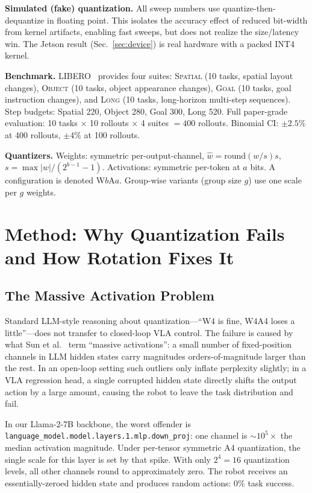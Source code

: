 \documentclass[conference]{IEEEtran}
\begin{document}
\textbf{Simulated (fake) quantization.} All sweep numbers use quantize-then-dequantize in
floating point. This isolates the accuracy effect of reduced bit-width from kernel artifacts,
enabling fast sweeps, but does not realize the size/latency win. The Jetson result
(Sec.~\ref{sec:device}) is real hardware with a packed INT4 kernel.

\textbf{Benchmark.} LIBERO~\cite{libero} provides four suites: \textsc{Spatial} (10 tasks,
spatial layout changes), \textsc{Object} (10 tasks, object appearance changes),
\textsc{Goal} (10 tasks, goal instruction changes), and \textsc{Long} (10 tasks,
long-horizon multi-step sequences). Step budgets: Spatial 220, Object 280, Goal 300, Long 520.
Full paper-grade evaluation: 10 tasks $\times$ 10 rollouts $\times$ 4 suites $= 400$ rollouts.
Binomial CI: $\pm 2.5\%$ at 400 rollouts, $\pm 4\%$ at 100 rollouts.

\textbf{Quantizers.}
Weights: symmetric per-output-channel, $\hat{w}=\mathrm{round}(w/s)s$,
$s=\max|w|/(2^{b-1}-1)$. Activations: symmetric per-token at $a$ bits. A configuration is
denoted W$b$A$a$. Group-wise variants (group size $g$) use one scale per $g$ weights.

\section{Method: Why Quantization Fails and How Rotation Fixes It}
\label{sec:method}

\subsection{The Massive Activation Problem}
\label{sec:massive}

Standard LLM-style reasoning about quantization---``W4 is fine, W4A4 loses a little''---does
not transfer to closed-loop VLA control. The failure is caused by what Sun et al.~\cite{sun2024massive}
term ``massive activations'': a small number of fixed-position channels in LLM hidden states
carry magnitudes orders-of-magnitude larger than the rest. In an open-loop setting such outliers
only inflate perplexity slightly; in a VLA regression head, a single corrupted hidden state
directly shifts the output action by a large amount, causing the robot to leave the task
distribution and fail.

In our Llama-2-7B backbone, the worst offender is
\texttt{language\_model.model.layers.1.mlp.down\_proj}: one channel is
$\sim\!10^5\times$ the median activation magnitude. Under per-tensor symmetric A4 quantization,
the single scale for this layer is set by that spike. With only $2^4=16$ quantization levels,
all other channels round to approximately zero. The robot receives an essentially-zeroed hidden
state and produces random actions: 0\% task success.
\end{document}
